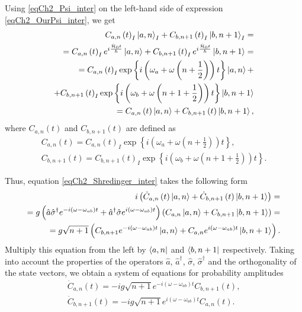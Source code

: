 Using \eqref{eqCh2_Psi_inter} on the left-hand side of expression
\eqref{eqCh2_OurPsi_inter}, we get 
\begin{eqnarray}
C_{a,n}\left(t\right)_I\ket{a, n}_I +
C_{b,n+1}\left(t\right)_I\ket{b, n + 1}_I =
\nonumber \\
= C_{a,n}\left(t\right)_I e^{i \frac{\hat{\mathcal{H}}_0
    t}{\hbar}} \ket{a, n} +
C_{b,n+1}\left(t\right)_I e^{i \frac{\hat{\mathcal{H}}_0
    t}{\hbar}} \ket{b, n + 1} = 
\nonumber \\
=
C_{a,n}\left(t\right)_I \exp\left\{i \left(
 \omega_a +  \omega 
\left( n + \frac{1}{2}\right) 
\right) t
\right\} \ket{a, n} +
\nonumber \\
+
C_{b,n+1}\left(t\right)_I \exp\left\{i 
\left(
\omega_b +  \omega 
\left( n + 1 + \frac{1}{2}\right) 
\right)
    t \right\} \ket{b, n + 1}
\nonumber \\
=
C_{a,n}\left(t\right) \ket{a, n} +
C_{b,n+1}\left(t\right) \ket{b, n + 1},
\nonumber
\end{eqnarray}
where $C_{a,n}\left(t\right)$ and $C_{b,n+1}\left(t\right)$ are defined as
\begin{eqnarray}
C_{a,n}\left(t\right) = 
C_{a,n}\left(t\right)_I \exp\left\{i 
\left(
\omega_a +  \omega 
\left( n + \frac{1}{2}\right) 
\right) 
    t \right\},
\nonumber \\
C_{b,n+1}\left(t\right) =
C_{b,n+1}\left(t\right)_I \exp\left\{i \left(
\omega_b + \omega 
\left( n + 1 + \frac{1}{2}\right) 
\right)
    t\right\}.
\nonumber
\end{eqnarray}

Thus, equation \eqref{eqCh2_Shredinger_inter} takes the following form   
\begin{eqnarray}
i \left( 
{\dot C}_{a,n}\left(t\right)\ket{a, n} +
{\dot C}_{b,n+1}\left(t\right)\ket{b, n + 1}
\right) =
\nonumber \\
= g \left(
\hat{a}\hat{\sigma}^{\dag} e^{-i \left(\omega - \omega_{ab}\right)t} +
\hat{a}^{\dag}\hat{\sigma} e^{i \left(\omega - \omega_{ab}\right)t}
\right) 
\left( 
C_{a,n}\ket{a, n} +
C_{b,n+1}\ket{b, n + 1}
\right) = 
\nonumber \\
= g \sqrt{n + 1} \left(
C_{b, n+1} e^{-i \left(\omega - \omega_{ab}\right)t} \ket{a, n} + 
C_{a, n} e^{i \left(\omega - \omega_{ab}\right)t} \ket{b, n + 1}
\right).
\end{eqnarray}
Multiply this equation from the left by 
$\bra{a, n}$ and $\bra{b, n + 1}$ respectively. Taking into account the properties
of the operators $\hat{a}$, $\hat{a}^{\dag}$, $\hat{\sigma}$,
$\hat{\sigma}^{\dag}$ and the orthogonality of the state vectors, we obtain  
a system of equations for probability amplitudes 
\begin{eqnarray}
{\dot C}_{a,n}\left(t\right) = -i g \sqrt{n + 1}
e^{-i \left(\omega - \omega_{ab}\right)t} 
C_{b, n + 1}\left(t\right),
\nonumber \\
{\dot C}_{b, n + 1}\left(t\right) = -i g \sqrt{n + 1}
e^{i \left(\omega - \omega_{ab}\right)t} 
C_{a, n}\left(t\right).
\label{eqCh2_task3}
\end{eqnarray}

